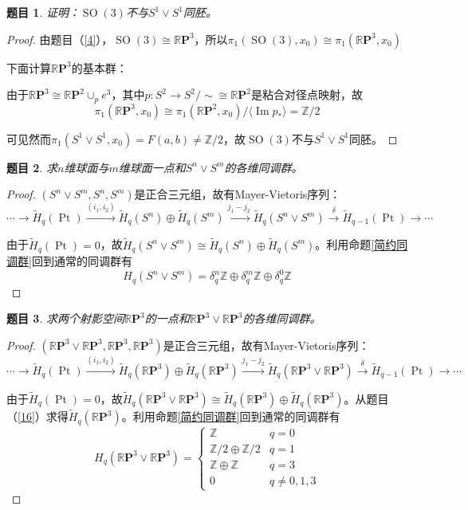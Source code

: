 \documentclass[UTF-8,11pt,fancyhdr,hyperref,titlepage]{ctexart}
\theoremstyle{question}
\newtheorem{timu}{题目}
\theoremstyle{theorem}
\theoremstyle{definition}
\theoremstyle{remark}
\def\ZZ{{\mathbb Z}}
\def\RP{\mathbb{R}\mathbf{P}}
\def\<{\langle}
\def\>{\rangle}
\def\longto{\longrightarrow}
\def\To{\longto}
\newcommand{\markar}[1]{\stackrel{{#1}}{\longrightarrow}}%
\newcommand{\rH}[1]{\widetilde{H}_{#1}}
\DeclareMathOperator{\im}{Im}
\DeclareMathOperator{\SO}{SO}
\DeclareMathOperator{\Pt}{Pt}
\begin{document}
\begin{timu}\label{13}
  证明：$\SO(3)$不与$S^1\vee S^1$同胚。
\end{timu}
\begin{proof}
  由题目（\ref{4}），$\SO(3)\cong\RP^3$，所以$\pi_1(\SO(3),x_0)\cong\pi_1(\RP^3,x_0)$

  下面计算$\RP^3$的基本群：

  由于$\RP^3\cong\RP^2\cup_pe^3$，其中$p\colon S^2\To S^2/\sim\cong\RP^2$是粘合对径点映射，故
  \begin{equation*}
    \pi_1(\RP^3,x_0)\cong\pi_1(\RP^2,x_0)/\<\im p_{\ast}\>=\ZZ/2
  \end{equation*}

  可见然而$\pi_1(S^1\vee S^1,x_0)=F(a,b)\neq\ZZ/2$，故$\SO(3)$不与$S^1\vee S^1$同胚。
\end{proof}

\begin{timu}\label{14}
  求$n$维球面与$m$维球面一点和$S^n\vee S^m$的各维同调群。
\end{timu}
\begin{proof}
  $(S^n\vee S^m,S^n,S^m)$是正合三元组，故有Mayer-Vietoris序列：
  \begin{equation*}
    \cdots\To \rH{q}(\Pt)\markar{(i_1,i_2)} \rH{q}(S^n)\oplus\rH{q}(S^m) \markar{j_1-j_2} \rH{q}(S^n\vee S^m) \markar{\delta} \rH{q-1}(\Pt) \To \cdots
  \end{equation*}
  
  由于$\rH{q}(\Pt)=0$，故$\rH{q}(S^n\vee S^m)\cong\rH{q}(S^n)\oplus\rH{q}(S^m)$。利用命题\ref{简约同调群}回到通常的同调群有
  \begin{equation*}
    H_q(S^n\vee S^m)=\delta_q^n\ZZ\oplus\delta_q^m\ZZ\oplus\delta_q^0\ZZ
  \end{equation*}
\end{proof}

\begin{timu}\label{15}
  求两个射影空间$\RP^3$的一点和$\RP^3\vee\RP^3$的各维同调群。
\end{timu}
\begin{proof}
  $(\RP^3\vee \RP^3,\RP^3,\RP^3)$是正合三元组，故有Mayer-Vietoris序列：
  \begin{equation*}
    \cdots\To \rH{q}(\Pt)\markar{(i_1,i_2)} \rH{q}(\RP^3)\oplus\rH{q}(\RP^3) \markar{j_1-j_2} \rH{q}(\RP^3\vee \RP^3) \markar{\delta} \rH{q-1}(\Pt) \To \cdots
  \end{equation*}
  
  由于$\rH{q}(\Pt)=0$，故$\rH{q}(\RP^3\vee \RP^3)\cong\rH{q}(\RP^3)\oplus\rH{q}(\RP^3)$。从题目（\ref{16}）求得$\rH{q}(\RP^3)$。利用命题\ref{简约同调群}回到通常的同调群有
  \begin{equation*}
    H_q(\RP^3\vee \RP^3)=
    \begin{cases}
      \ZZ & q=0\\
      \ZZ/2\oplus\ZZ/2 & q=1\\
      \ZZ\oplus\ZZ & q=3\\
      0 & q\neq 0,1,3
    \end{cases}
  \end{equation*}
\end{proof}
\end{document}

